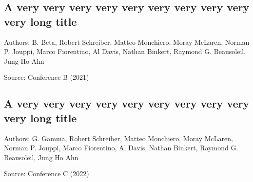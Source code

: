 \documentclass[../template.tex]{subfiles}
\begin{document}
\blindtext

\subsection{A very very very very very very very very very very long title \texorpdfstring{\hyperref[tab:literature]{\footnotesize \hfill{}}}{}}
\label{lit:labelOfSubsubsection2}		%
\begin{hanglist}
	\item Authors: B. Beta, Robert Schreiber, Matteo Monchiero, Moray McLaren, Norman P. Jouppi, Marco Fiorentino, Al Davis, Nathan Binkert, Raymond G. Beausoleil, Jung Ho Ahn \cite{B}
	\item Source: Conference B (2021)
\end{hanglist}

\blindtext



\subsection{A very very very very very very very very very very long title \texorpdfstring{\hyperref[tab:literature]{\footnotesize \hfill{}}}{}}
\label{lit:labelOfSubsubsection3}		%
\begin{hanglist}
	\item Authors: G. Gamma, Robert Schreiber, Matteo Monchiero, Moray McLaren, Norman P. Jouppi, Marco Fiorentino, Al Davis, Nathan Binkert, Raymond G. Beausoleil, Jung Ho Ahn \cite{G}
	\item Source: Conference C (2022)
\end{hanglist}

\blindtext

\end{document}
